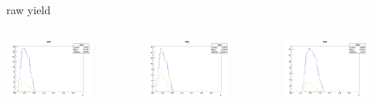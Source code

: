 \begin{frame}{raw yield}
\begin{columns}
\begin{column}[T]{0.25\textwidth}
\includegraphics[width = 0.7\textwidth]{results/yield/statistics/yield_x_Q2_z_0.45_4.750_0.40_pos.png}
\end{column}
\begin{column}[T]{0.25\textwidth}
\includegraphics[width = 0.7\textwidth]{results/yield/statistics/yield_x_Q2_z_0.45_4.750_0.40_neg.png}
\end{column}
\begin{column}[T]{0.25\textwidth}
\includegraphics[width = 0.7\textwidth]{results/yield/statistics/yield_x_Q2_z_0.45_4.750_0.50_pos.png}

\end{column}
\end{columns}
\end{frame}
